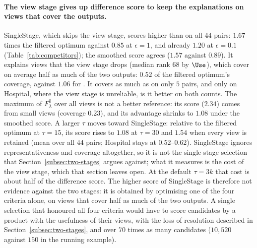 \paragraph{The view stage gives up difference score to keep the explanations on views that cover the outputs.}
\textsf{SingleStage}, which skips the view stage, scores higher than \sys{} on all $44$ pairs: $1.67$ times the filtered optimum against $0.85$ at $\epsilon=1$, and already $1.20$ at $\epsilon=0.1$ (Table~\ref{tab:competitors}); the smoothed score agrees ($1.57$ against $0.89$).
It explains views that the view stage drops (median rank $68$ by $\Use$), which cover on average half as much of the two outputs: $0.52$ of the filtered optimum's coverage, against $1.06$ for \sys{}.
It covers as much as \sys{} on only $5$ pairs, and only on Hospital, where the view stage is unreliable, is it better on both counts.
The maximum of $F^0_\lambda$ over all views is not a better reference: its score ($2.34$) comes from small views (coverage $0.23$), and its advantage shrinks to $1.08$ under the smoothed score.
A larger $\tau$ moves \sys{} toward \textsf{SingleStage}: relative to the filtered optimum at $\tau=15$, its score rises to $1.08$ at $\tau=30$ and $1.54$ when every view is retained (mean over all $44$ pairs; Hospital stays at $0.52$--$0.62$).
\textsf{SingleStage} ignores representativeness and coverage altogether, so it is not the single-stage selection that Section~\ref{subsec:two-stages} argues against; what it measures is the cost of the view stage, which that section leaves open.
At the default $\tau=3k$ that cost is about half of the difference score.
The higher score of \textsf{SingleStage} is therefore not evidence against the two stages: it is obtained by optimising one of the four criteria alone, on views that cover half as much of the two outputs.
A single selection that honoured all four criteria would have to score candidates by a product with the usefulness of their views, with the loss of resolution described in Section~\ref{subsec:two-stages}, and over $70$ times as many candidates ($10{,}520$ against $150$ in the running example).

